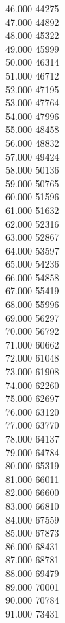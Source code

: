 { 46.000	44275 \\
 47.000	44892 \\
 48.000	45322 \\
 49.000	45999 \\
 50.000	46314 \\
 51.000	46712 \\
 52.000	47195 \\
 53.000	47764 \\
 54.000	47996 \\
 55.000	48458 \\
 56.000	48832 \\
 57.000	49424 \\
 58.000	50136 \\
 59.000	50765 \\
 60.000	51596 \\
 61.000	51632 \\
 62.000	52316 \\
 63.000	52867 \\
 64.000	53597 \\
 65.000	54236 \\
 66.000	54858 \\
 67.000	55419 \\
 68.000	55996 \\
 69.000	56297 \\
 70.000	56792 \\
 71.000	60662 \\
 72.000	61048 \\
 73.000	61908 \\
 74.000	62260 \\
 75.000	62697 \\
 76.000	63120 \\
 77.000	63770 \\
 78.000	64137 \\
 79.000	64784 \\
 80.000	65319 \\
 81.000	66011 \\
 82.000	66600 \\
 83.000	66810 \\
 84.000	67559 \\
 85.000	67873 \\
 86.000	68431 \\
 87.000	68781 \\
 88.000	69479 \\
 89.000	70001 \\
 90.000	70784 \\
 91.000	73431 \\
}
